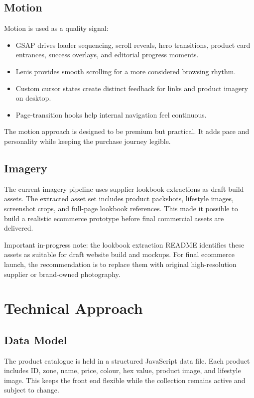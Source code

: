 \documentclass[11pt,a4paper]{article}
\begin{document}
\subsection{Motion}

Motion is used as a quality signal:

\begin{itemize}
    \item GSAP drives loader sequencing, scroll reveals, hero transitions, product card entrances, success overlays, and editorial progress moments.
    \item Lenis provides smooth scrolling for a more considered browsing rhythm.
    \item Custom cursor states create distinct feedback for links and product imagery on desktop.
    \item Page-transition hooks help internal navigation feel continuous.
\end{itemize}

The motion approach is designed to be premium but practical. It adds pace and personality while keeping the purchase journey legible.

\subsection{Imagery}

The current imagery pipeline uses supplier lookbook extractions as draft build assets. The extracted asset set includes product packshots, lifestyle images, screenshot crops, and full-page lookbook references. This made it possible to build a realistic ecommerce prototype before final commercial assets are delivered.

Important in-progress note: the lookbook extraction README identifies these assets as suitable for draft website build and mockups. For final ecommerce launch, the recommendation is to replace them with original high-resolution supplier or brand-owned photography.

\section{Technical Approach}

\subsection{Data Model}

The product catalogue is held in a structured JavaScript data file. Each product includes ID, zone, name, price, colour, hex value, product image, and lifestyle image. This keeps the front end flexible while the collection remains active and subject to change.
\end{document}
